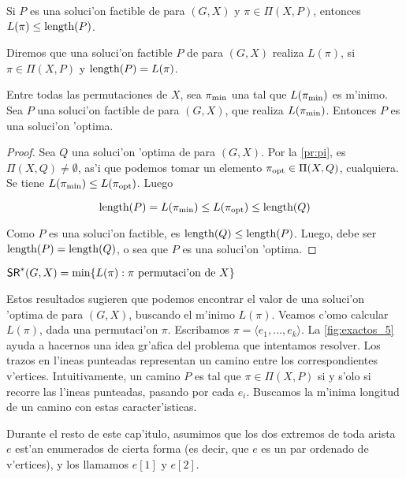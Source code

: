 \begin{remark}
Si $P$ es una soluci'on factible de  para $(G, X)$ y $\pi \in \Pi(X, P)$, entonces $L(\pi) \leq \textnormal{length}(P)$.
\end{remark}

Diremos que una soluci'on factible $P$ de  para $(G, X)$ realiza $L(\pi)$, si $\pi \in \Pi(X, P)$ y $\textnormal{length}(P) = L(\pi)$.

\begin{lemma}
\label{le:pi_min}
Entre todas las permutaciones de $X$, sea $\pi_{\textnormal{min}}$ una tal que $L(\pi_{\textnormal{min}})$ es m'inimo. Sea $P$ una soluci'on factible de  para $(G, X)$, que realiza $L(\pi_{\textnormal{min}})$. Entonces $P$ es una soluci'on 'optima.

\begin{proof}
Sea $Q$ una soluci'on 'optima de  para $(G, X)$. Por la \autoref{pr:pi}, es $\Pi(X, Q) \neq \emptyset$, as'i que podemos tomar un elemento $\pi_{\textnormal{opt}} \in \Pi(X, Q)$, cualquiera. Se tiene $L(\pi_{\textnormal{min}}) \leq L(\pi_{\textnormal{opt}})$. Luego

\[\textnormal{length}(P) = L(\pi_{\textnormal{min}}) \leq L(\pi_{\textnormal{opt}}) \leq \textnormal{length}(Q)\]

\noindent
Como $P$ es una soluci'on factible, es $\textnormal{length}(Q) \leq \textnormal{length}(P)$. Luego, debe ser $\textnormal{length}(P) = \textnormal{length}(Q)$, o sea que $P$ es una soluci'on 'optima.
\end{proof}
\end{lemma}

\begin{corollary}
\label{co:sr_longitud_minima_permutacion}
$\textnormal{\textsf{SR}}^*(G, X) = \min \{L(\pi) : \pi \text{ permutaci'on de } X\}$
\end{corollary}

Estos resultados sugieren que podemos encontrar el valor de una soluci'on 'optima de  para $(G, X)$, buscando el m'inimo $L(\pi)$. Veamos c'omo calcular $L(\pi)$, dada una permutaci'on $\pi$. Escribamos $\pi = \langle e_1, \dots, e_k \rangle$. La \autoref{fig:exactos_5} ayuda a hacernos una idea gr'afica del problema que intentamos resolver. Los trazos en l'ineas punteadas representan un camino entre los correspondientes v'ertices. Intuitivamente, un camino $P$ es tal que $\pi \in \Pi(X, P)$ si y s'olo si recorre las l'ineas punteadas, pasando por cada $e_i$. Buscamos la m'inima longitud de un camino con estas caracter'isticas.

Durante el resto de este cap'itulo, asumimos que los dos extremos de toda arista $e$ est'an enumerados de cierta forma (es decir, que $e$ es un par ordenado de v'ertices), y los llamamos $e[1]$ y $e[2]$.

